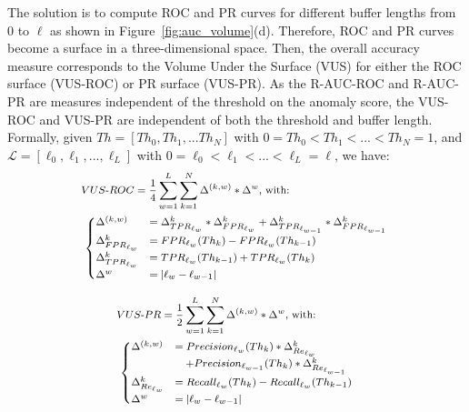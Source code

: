 The solution is to compute ROC and PR curves for different buffer lengths from 0 to $\ell$ as shown in Figure~\ref{fig:auc_volume}(d). Therefore, ROC and PR curves become a surface in a three-dimensional space. Then, the overall accuracy measure corresponds to the Volume Under the Surface (VUS) for either the ROC surface (VUS-ROC) or PR surface (VUS-PR). As the R-AUC-ROC and R-AUC-PR are measures independent of the threshold on the anomaly score, the VUS-ROC and VUS-PR are independent of both the threshold and buffer length. Formally, given $Th=[Th_0,Th_1,...Th_N]$ with $0=Th_0<Th_1<...<Th_N=1$, and $\mathcal{L}=[\ell_0,\ell_1,...,\ell_L]$ with $0=\ell_0<\ell_1< ... < \ell_L = \ell$, we have:
\begin{equation}
\footnotesize{
\begin{split}
&VUS\text{-}ROC = \frac{1}{4}\sum_{w=1}^{L} \sum_{k=1}^{N} \Delta^{(k,w)} * \Delta^{w} \text{, with: }\\
&\left.
\begin{cases}
\Delta^{(k,w)} &= \Delta^{k}_{TPR_{\ell_w}}*\Delta^{k}_{FPR_{\ell_w}}+\Delta^{k}_{TPR_{\ell_{w-1}}}*\Delta^{k}_{FPR_{\ell_{w-1}}} \\
\Delta^{k}_{FPR_{\ell_w}} &= FPR_{\ell_w}(Th_{k})-FPR_{\ell_w}(Th_{k-1}) \\
\Delta^{k}_{TPR_{\ell_w}} &= TPR_{\ell_w}(Th_{k-1})+TPR_{\ell_w}(Th_{k}) \\
\Delta^{w} &= |\ell_w - \ell_{w-1}|
\end{cases}
\right. 
\end{split}
\label{equVUSROC}
}
\end{equation}

\begin{equation}
\footnotesize{
\begin{split}
&VUS\text{-}PR = \frac{1}{2}\sum_{w=1}^{L} \sum_{k=1}^{N} \Delta^{(k,w)} * \Delta^{w} \text{, with: }\\
&\left.
\begin{cases}
\Delta^{(k,w)} &= {Precision_{\ell_w}(Th_k)}*\Delta^{k}_{Re_{\ell_w}}\\  &\quad+{Precision_{\ell_{w-1}}(Th_k)}*\Delta^{k}_{Re_{\ell_{w-1}}} \\
\Delta^{k}_{Re_{\ell_w}} &= Recall_{\ell_w}(Th_{k})-Recall_{\ell_w}(Th_{k-1}) \\
\Delta^{w} &= |\ell_w - \ell_{w-1}|
\end{cases}
\right. 
\end{split}
\label{equVUSPR}
}
\end{equation} 

